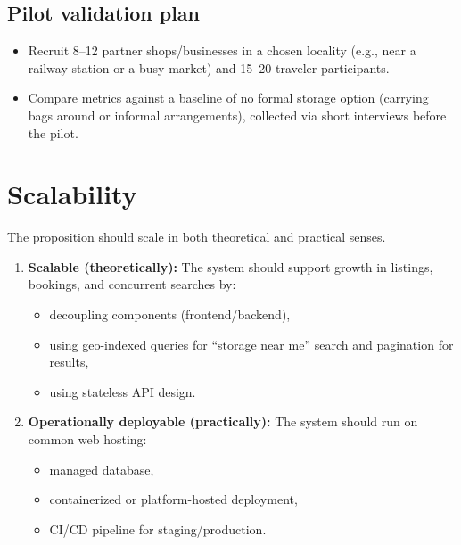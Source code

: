 \documentclass[11pt,a4paper]{article}
\begin{document}
\subsection{Pilot validation plan}
\begin{itemize}[leftmargin=0.7cm]
    \item Recruit 8--12 partner shops/businesses in a chosen locality (e.g., near a railway station or a busy market) and 15--20 traveler participants.
    \item Compare metrics against a baseline of no formal storage option (carrying bags around or informal arrangements), collected via short interviews before the pilot.
\end{itemize}

\section{Scalability}
The proposition should scale in both theoretical and practical senses.

\begin{enumerate}[leftmargin=0.7cm]
    \item \textbf{Scalable (theoretically):} The system should support growth in listings, bookings, and concurrent searches by:
    \begin{itemize}[leftmargin=0.7cm]
        \item decoupling components (frontend/backend),
        \item using geo-indexed queries for ``storage near me'' search and pagination for results,
        \item using stateless API design.
    \end{itemize}
    
    \item \textbf{Operationally deployable (practically):} The system should run on common web hosting:
    \begin{itemize}[leftmargin=0.7cm]
        \item managed database,
        \item containerized or platform-hosted deployment,
        \item CI/CD pipeline for staging/production.
    \end{itemize}
\end{enumerate}
\end{document}
